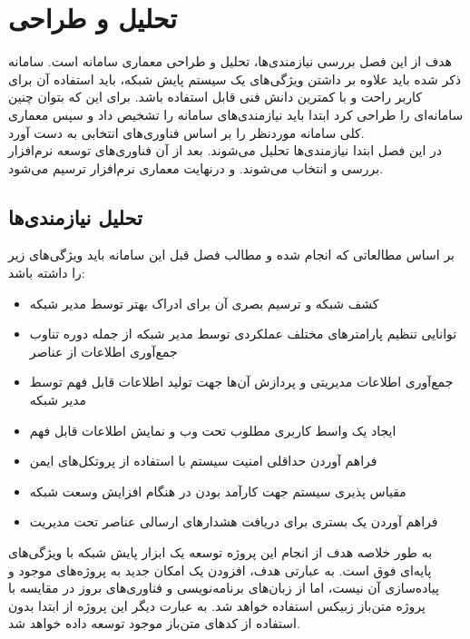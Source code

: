 \chapter{تحلیل و طراحی}

هدف از این فصل بررسی نیازمندی‌ها، تحلیل و طراحی معماری سامانه است. سامانه ذکر شده باید علاوه بر داشتن ویژگی‌های یک سیستم پایش شبکه، باید استفاده آن برای کاربر راحت و با کمترین دانش فنی قابل استفاده باشد. برای این که بتوان چنین سامانه‌ای را طراحی کرد ابتدا باید نیازمندی‌های سامانه را تشخیص داد و سپس معماری کلی سامانه موردنظر را بر اساس فناوری‌های انتخابی به دست آورد.
\\
در این فصل ابتدا نیازمندی‌ها تحلیل می‌شوند. بعد از آن فناوری‌های توسعه نرم‌افزار بررسی و انتخاب می‌شوند. و درنهایت معماری نرم‌افزار ترسیم می‌شود.



\section{تحلیل نیازمندی‌ها}

 بر اساس مطالعاتی که انجام شده و مطالب فصل قبل این سامانه باید ویژگی‌های زیر را داشته باشد:

\begin{itemize}
    \item کشف شبکه و ترسیم بصری آن برای ادراک بهتر توسط مدیر شبکه
    \item توانایی تنظیم پارامترهای مختلف عملکردی توسط مدیر شبکه از جمله دوره تناوب جمع‌آوری اطلاعات از عناصر
    \item جمع‌آوری اطلاعات مدیریتی و پردازش آن‌ها جهت تولید اطلاعات قابل فهم توسط مدیر شبکه
    \item ایجاد یک واسط کاربری مطلوب تحت وب و نمایش اطلاعات قابل فهم 
    \item فراهم آوردن حداقلی امنیت سیستم با استفاده از پروتکل‌های ایمن
    \item مقیاس پذیری سیستم جهت کارآمد بودن در هنگام افزایش وسعت شبکه
    \item فراهم آوردن یک بستری برای دریافت هشدارهای ارسالی عناصر تحت مدیریت
\end{itemize}

\newpage

به طور خلاصه هدف از انجام این پروژه توسعه یک ابزار پایش شبکه با ویژگی‌های پایه‌ای فوق است. به عبارتی هدف، افزودن یک امکان جدید به پروژه‌های موجود و پیاده‌سازی آن نیست، اما از زبان‌های برنامه‌نویسی و فناوری‌های بروز در مقایسه با پروژه متن‌باز زبیکس استفاده خواهد شد. به عبارت دیگر این پروژه از ابتدا بدون استفاده از کدهای متن‌باز موجود توسعه داده خواهد شد.



